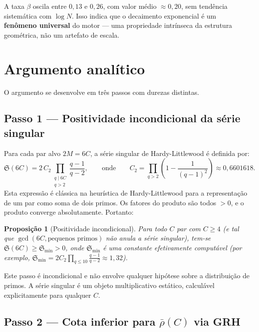 \documentclass[11pt]{article}
\newtheorem{proposition}[theorem]{Proposição}
\theoremstyle{definition}
\begin{document}
	A taxa $\beta$ oscila entre $0{,}13$ e $0{,}26$, com valor médio $\approx 0{,}20$, sem tendência sistemática com $\log N$. Isso indica que o decaimento exponencial é um \textbf{fenômeno universal} do motor — uma propriedade intrínseca da estrutura geométrica, não um artefato de escala.
	
	\section{Argumento analítico}
	
	O argumento se desenvolve em três passos com durezas distintas.
	
	\subsection{Passo 1 — Positividade incondicional da série singular}
	
	Para cada par alvo $2M = 6C$, a série singular de Hardy-Littlewood é definida por:
	\[
	\mathfrak{S}(6C) = 2\,C_2 \prod_{\substack{q\mid 6C \\ q>2}} \frac{q-1}{q-2},
	\qquad\text{onde}\qquad 
	C_2 = \prod_{q>2} \left(1-\frac{1}{(q-1)^2}\right) \approx 0{,}6601618.
	\]
	Esta expressão é clássica na heurística de Hardy-Littlewood para a representação de um par como soma de dois primos. Os fatores do produto são todos $>0$, e o produto converge absolutamente. Portanto:
	
	\begin{proposition}[Positividade incondicional]
		Para todo $C$ par com $C\ge 4$ (e tal que $\gcd(6C,\text{pequenos primos})$ não anula a série singular), tem-se $\mathfrak{S}(6C)\ge \mathfrak{S}_{\min}>0$, onde $\mathfrak{S}_{\min}$ é uma constante efetivamente computável (por exemplo, $\mathfrak{S}_{\min}=2C_2\prod_{q\le 10}\frac{q-1}{q-2}\approx 1{,}32$). 
	\end{proposition}
	
	Este passo é incondicional e não envolve qualquer hipótese sobre a distribuição de primos. A série singular é um objeto multiplicativo estático, calculável explicitamente para qualquer $C$.
	
	\subsection{Passo 2 — Cota inferior para $\bar\rho(C)$ via GRH}
	
\end{document}

